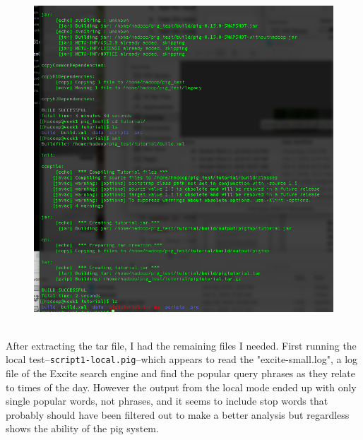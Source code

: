 \documentclass[10pt]{article}
\begin{document}
\pagebreak
\begin{figure}[!h]
\includegraphics[scale=0.37]{ant_good.png}
\centering
\end{figure}\\
\indent After extracting the tar file, I had the remaining files I needed. First running the local test--\verb|script1-local.pig|--which appears to read the "excite-small.log", a log file of the Excite search engine and find the popular query phrases as they relate to times of the day. However the output from the local mode ended up with only single popular words, not phrases, and it seems to include stop words that probably should have been filtered out to make a better analysis but regardless shows the ability of the pig system.
\par
{}%
\hfill
{}%
\end{document}
